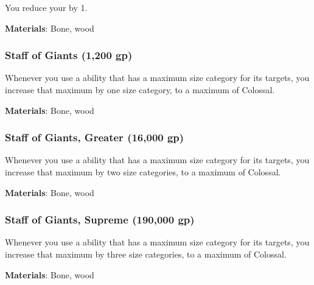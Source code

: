 You reduce your  by 1.



\vspace{0.25em}
\textbf{Materials}: Bone, wood


\lowercase{\hypertarget{item:Staff of Giants}{}}\label{item:Staff of Giants}
\hypertarget{item:Staff of Giants}{\subsubsection{Staff of Giants\hfill{} (1,200 gp)}}

Whenever you use a  ability that has a maximum size category for its targets, you increase that maximum by one size category, to a maximum of Colossal.



\vspace{0.25em}
\textbf{Materials}: Bone, wood


\lowercase{\hypertarget{item:Staff of Giants, Greater}{}}\label{item:Staff of Giants, Greater}
\hypertarget{item:Staff of Giants, Greater}{\subsubsection{Staff of Giants, Greater\hfill{} (16,000 gp)}}

Whenever you use a  ability that has a maximum size category for its targets, you increase that maximum by two size categories, to a maximum of Colossal.



\vspace{0.25em}
\textbf{Materials}: Bone, wood


\lowercase{\hypertarget{item:Staff of Giants, Supreme}{}}\label{item:Staff of Giants, Supreme}
\hypertarget{item:Staff of Giants, Supreme}{\subsubsection{Staff of Giants, Supreme\hfill{} (190,000 gp)}}

Whenever you use a  ability that has a maximum size category for its targets, you increase that maximum by three size categories, to a maximum of Colossal.



\vspace{0.25em}
\textbf{Materials}: Bone, wood


